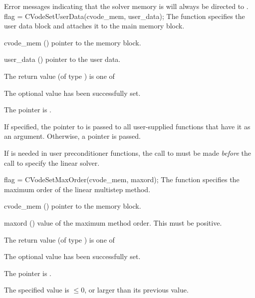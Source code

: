 {
  Error messages indicating that the {\cvode} solver memory is  will 
  always be directed to .
}
{
  flag = CVodeSetUserData(cvode\_mem, user\_data);
}
{
  The function  specifies the user data block 
  and attaches it to the main {\cvode} memory block.
}
{
  \begin{args}
  \item[cvode\_mem] ()
    pointer to the {\cvode} memory block.
  \item[user\_data] ()
    pointer to the user data.
  \end{args}
}
{
  The return value  (of type ) is one of
  \begin{args}
  \item[\Id{CV\_SUCCESS}] 
    The optional value has been successfully set.
  \item[\Id{CV\_MEM\_NULL}]
    The  pointer is .
  \end{args}
}
{
  If specified, the pointer to  is passed to all user-supplied 
  functions that have it as an argument. Otherwise, a  pointer is passed.

  {\warn}If  is needed in user preconditioner functions, the call to
   must be made {\it before} the call to specify the
  linear solver.
}
{
flag = CVodeSetMaxOrder(cvode\_mem, maxord);
}
{
  The function  specifies the maximum order of the 
  linear multistep method.
}
{
  \begin{args}
  \item[cvode\_mem] ()
    pointer to the {\cvode} memory block.
  \item[maxord] ()
    value of the maximum method order.  This must be positive.
  \end{args}
}
{
  The return value  (of type ) is one of
  \begin{args}
  \item[\Id{CV\_SUCCESS}] 
    The optional value has been successfully set.
  \item[\Id{CV\_MEM\_NULL}]
    The  pointer is .
  \item[\Id{CV\_ILL\_INPUT}]
    The specified value  is $\leq 0$, or larger than 
    its previous value.
  \end{args}
}
